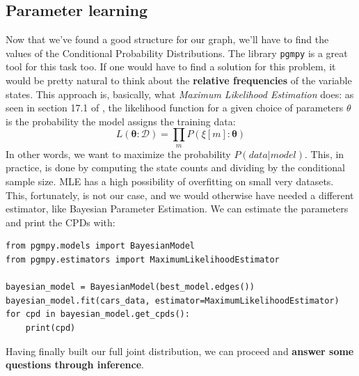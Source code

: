 \subsection{Parameter learning}
Now that we've found a good structure for our graph, we'll have to find the values of the Conditional Probability Distributions. The library \texttt{pgmpy} is a great tool for this task too. If one would have to find a solution for this problem, it would be pretty natural to think about the \textbf{relative frequencies} of the variable states. This approach is, basically, what \textit{Maximum Likelihood Estimation} does: as seen in section 17.1 of \cite{book:probgraphmod}, the likelihood function for a given choice of parameters $\theta$ is the probability the model assigns the training data:
\begin{equation}
L(\boldsymbol{\theta}: \mathcal{D})=\prod_{m} P(\xi[m]: \boldsymbol{\theta})
\end{equation}
In other words, we want to maximize the probability $P(data|model)$. This, in practice, is done by computing the state counts and dividing by the conditional sample size.
MLE has a high possibility of overfitting on small very datasets. This, fortunately, is not our case, and we would otherwise have needed a different estimator, like Bayesian Parameter Estimation. We can estimate the parameters and print the CPDs with:
\begin{verbatim}
from pgmpy.models import BayesianModel
from pgmpy.estimators import MaximumLikelihoodEstimator

bayesian_model = BayesianModel(best_model.edges())
bayesian_model.fit(cars_data, estimator=MaximumLikelihoodEstimator)
for cpd in bayesian_model.get_cpds():
    print(cpd)
\end{verbatim}
Having finally built our full joint distribution, we can proceed and \textbf{answer some questions through inference}.